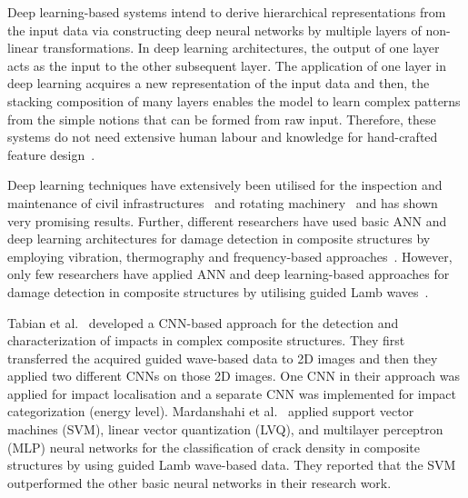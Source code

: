 Deep learning-based systems intend to derive hierarchical representations
from the input data via constructing deep neural networks by multiple layers
of non-linear transformations.
In deep learning architectures, the output of one layer acts as the input to the other subsequent layer.
The application of one layer in deep learning acquires a new representation of the input data and then, the stacking composition of many layers enables the model to learn complex patterns from the simple notions that can be formed from raw input.
Therefore, these systems do not need extensive human labour and knowledge for hand-crafted feature design~\cite{zhao2019deep, yuan2020machine}.

Deep learning techniques have extensively been utilised for the inspection and
maintenance of civil infrastructures~\cite{cha2017deep, lin2017structural, liu2019computer} and rotating machinery~\cite{janssens2016convolutional, jia2016deep} and has shown very promising results.
Further, different researchers have used basic ANN and deep learning architectures for damage detection in composite structures by employing vibration, thermography and frequency-based approaches~\cite{islam1994damage, okafor1996delamination, chakraborty2005artificial, khan2019structural, luo2019temporal, bang2020defect}. 
However, only few researchers have applied ANN and deep learning-based approaches for damage detection in composite structures by utilising guided Lamb waves~\cite{su2004lamb, chetwynd2008damage, de2015application, tabian2019convolutional, feng2019locating, mardanshahi2020detection}.


Tabian et al.~\cite{tabian2019convolutional} developed a CNN-based approach for the detection and characterization of impacts in complex composite structures.
They first transferred the acquired guided wave-based data to 2D images and then they applied two different CNNs on those 2D images.
One CNN in their approach was applied for impact localisation and a separate CNN was implemented for impact categorization (energy level).
Mardanshahi et al.~\cite{mardanshahi2020detection} applied support vector machines (SVM), linear vector quantization (LVQ), and multilayer perceptron (MLP) neural networks for the classification of crack density in composite structures by using guided Lamb wave-based data.
They reported that the SVM outperformed the other basic neural networks in
their research work.



